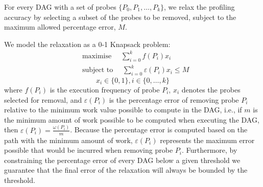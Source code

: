 For every DAG with a set of probes $\{P_0, P_1, \ldots, P_k\}$, we relax the profiling accuracy by selecting a subset of the probes to be removed, subject to the maximum allowed percentage error, $M$.

We model the relaxation as a 0-1 Knapsack problem:
\begin{equation*}
\begin{aligned}
& \textrm{maximise }\quad \sum_{i=0}^{k} f(P_i)x_i \\
& \textrm{subject to }\quad \sum_{i=0}^{k} \varepsilon(P_i)x_i \leq M
\end{aligned}
\end{equation*}
\[
x_i\in\{0,1\}, i\in\{0,\ldots,k\}
\]
where $f(P_i)$ is the execution frequency of probe $P_i$, $x_i$ denotes the probes selected for removal, and $\varepsilon(P_i)$ is the percentage error of removing probe $P_i$ relative to the minimum work value possible to compute in the DAG, i.e., if $m$ is the minimum amount of work possible to be computed when executing the DAG, then $\varepsilon(P_i) = \frac{\omega(P_i)}{m}$.
Because the percentage error is computed based on the path with the minimum amount of work, $\varepsilon(P_i)$ represents the maximum error possible that would be incurred when removing probe $P_i$.
Furthermore, by constraining the percentage error of every DAG below a given threshold we guarantee that the final error of the relaxation will always be bounded by the threshold.

